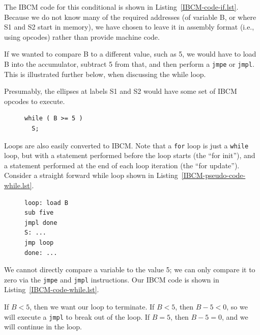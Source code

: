The IBCM code for this conditional is shown in
Listing~\ref{IBCM-code-if.lst}.  Because we do not know many of the
required addresses (of variable B, or where S1 and S2 start in
memory), we have chosen to leave it in assembly format (i.e., using
opcodes) rather than provide machine code.

If we wanted to compare B to a different value, such as 5, we would
have to load B into the accumulator, subtract 5 from that, and then
perform a {\tt jmpe} or {\tt jmpl}.  This is illustrated further
below, when discussing the while loop.

Presumably, the ellipses at labels S1 and S2 would have some set of
IBCM opcodes to execute.

\begin{figure}
\vspace{0.1in}
\begin{lstlisting}[backgroundcolor=\color{white},frame=trBL,linewidth=2in,xleftmargin=0.25in,label={IBCM-pseudo-code-while.lst},caption={{\bf while} pseudo code}]
while ( B >= 5 )
  S;
\end{lstlisting}
\vspace{0.25in}
\end{figure}

Loops are also easily converted to IBCM.  Note that a {\tt for} loop
is just a {\tt while} loop, but with a statement performed before the
loop starts (the ``for init''), and a statement performed at the end
of each loop iteration (the ``for update'').  Consider a straight
forward while loop shown in Listing~\ref{IBCM-pseudo-code-while.lst}.

\begin{figure}
\vspace{-0.7in}
\begin{lstlisting}[backgroundcolor=\color{white},frame=trBL,linewidth=2in,xleftmargin=0.25in,label={IBCM-code-while.lst},caption={IBCM {\bf while} code}]
loop: load B
sub five
jmpl done
S: ...
jmp loop
done: ...
\end{lstlisting}
\vspace{-0.5in}
\end{figure}

We cannot directly compare a variable to the value 5; we can only
compare it to zero via the {\tt jmpe} and {\tt jmpl} instructions.
Our IBCM code is shown in Listing~\ref{IBCM-code-while.lst}.

If $B<5$, then we want our loop to terminate.  If $B<5$, then $B-5<0$,
so we will execute a {\tt jmpl} to break out of the loop.  If $B=5$,
then $B-5=0$, and we will continue in the loop.

